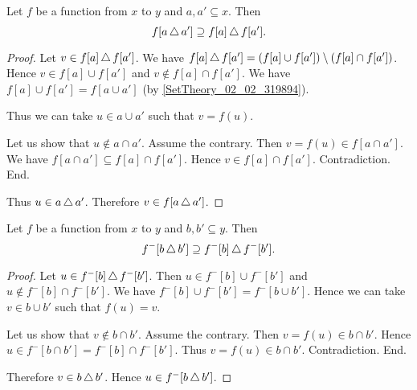 \documentclass[../../set-theory.ftl.tex]{subfiles}
\begin{document}
  \begin{forthel}
    \begin{proposition}\label{SetTheory_02_04_657921}
      Let $f$ be a function from $x$ to $y$ and $a,a' \subseteq x$.
      Then \[ f[a \mathop{\triangle} a'] \supseteq f[a] \mathop{\triangle} f[a']. \]
    \end{proposition}
    \begin{proof}
      Let $v \in f[a] \mathop{\triangle} f[a']$.
      We have $f[a] \mathop{\triangle} f[a'] = (f[a] \cup f[a']) \setminus (f[a] \cap f[a'])$.
      Hence $v \in f[a] \cup f[a']$ and $v \notin f[a] \cap f[a']$.
      We have $f[a] \cup f[a'] = f[a \cup a']$ (by \ref{SetTheory_02_02_319894}).

      Thus we can take $u \in a \cup a'$ such that $v = f(u)$.

      Let us show that $u \notin a \cap a'$.
        Assume the contrary.
        Then $v = f(u) \in f[a \cap a']$.
        We have $f[a \cap a'] \subseteq f[a] \cap f[a']$.
        Hence $v \in f[a] \cap f[a']$.
        Contradiction.
      End.

      Thus $u \in a \mathop{\triangle} a'$.
      Therefore $v \in f[a \mathop{\triangle} a']$.
    \end{proof}


    \begin{proposition}\label{SetTheory_02_04_661750}
      Let $f$ be a function from $x$ to $y$ and $b,b' \subseteq y$.
      Then \[ f^{-}[b \mathop{\triangle} b'] \supseteq f^{-}[b] \mathop{\triangle} f^{-}[b']. \]
    \end{proposition}
    \begin{proof}
      Let $u \in f^{-}[b] \mathop{\triangle} f^{-}[b']$.
      Then $u \in f^{-}[b] \cup f^{-}[b']$ and $u \notin f^{-}[b] \cap f^{-}[b']$.
      We have $f^{-}[b] \cup f^{-}[b'] = f^{-}[b \cup b']$.
      Hence we can take $v \in b \cup b'$ such that $f(u) = v$.

      Let us show that $v \notin b \cap b'$.
        Assume the contrary.
        Then $v = f(u) \in b \cap b'$.
        Hence $u \in f^{-}[b \cap b'] = f^{-}[b] \cap f^{-}[b']$.
        Thus $v = f(u) \in b \cap b'$.
        Contradiction.
      End.

      Therefore $v \in b \mathop{\triangle} b'$.
      Hence $u \in f^{-}[b \mathop{\triangle} b']$.
    \end{proof}
  \end{forthel}
\end{document}
